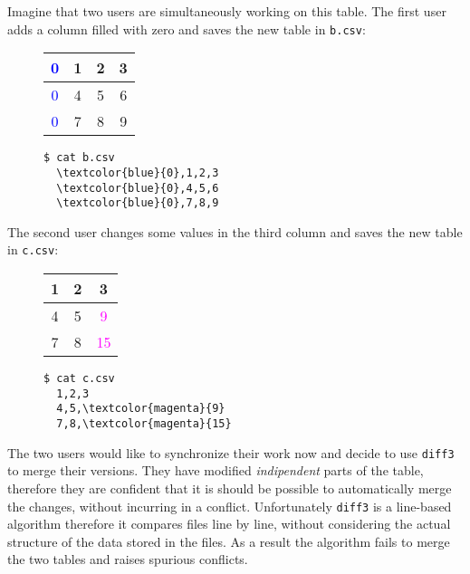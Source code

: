 \documentclass[preprint]{sigplanconf}
\theoremstyle{plain}
\begin{document}
\newpage
Imagine that two users are simultaneously working on this table.
The first user adds a column filled with zero and saves the new table in \texttt{b.csv}:
\begin{figure}[h]
\centering
\begin{minipage}{.25\textwidth}
  \centering
  \begin{tabular}{ | c | c | c | c | }
    \hline
    \textcolor{blue}{0} & 1 & 2 & 3 \\ \hline
    \textcolor{blue}{0} & 4 & 5 & 6 \\ \hline
    \textcolor{blue}{0} & 7 & 8 & 9  \\ \hline
  \end{tabular}
\end{minipage}%
\begin{minipage}{.25\textwidth}
  \centering
\begin{Verbatim}[commandchars=\\\{\}]
  $ cat b.csv
  \textcolor{blue}{0},1,2,3
  \textcolor{blue}{0},4,5,6
  \textcolor{blue}{0},7,8,9
\end{Verbatim}
\end{minipage}%
\end{figure} 

The second user changes some values in the third column and saves the new table in  \texttt{c.csv}:
\begin{figure}[h]
\centering
\begin{minipage}{.25\textwidth}
  \centering
  \begin{tabular}{ | c | c | c | }
    \hline
    1 & 2 & 3 \\ \hline
    4 & 5 & \textcolor{magenta}{9} \\ \hline
    7 & 8 & \textcolor{magenta}{15} \\ \hline
  \end{tabular}
\end{minipage}%
\begin{minipage}{.25\textwidth}
  \centering
  \begin{Verbatim}[commandchars=\\\{\}]
  $ cat c.csv
  1,2,3
  4,5,\textcolor{magenta}{9}
  7,8,\textcolor{magenta}{15}
  \end{Verbatim}
\end{minipage}%
\end{figure}

The two users would like to synchronize their work now and decide to use 
\texttt{diff3} to merge their versions. They have modified \emph{indipendent} parts of the table, therefore they are confident that it is should be possible to automatically merge the changes, without incurring in a conflict.
Unfortunately \texttt{diff3} is a line-based algorithm therefore it compares files line by line, without considering the actual structure of the data stored in the files. As a result the algorithm fails to merge the two tables and raises spurious conflicts.
\end{document}
